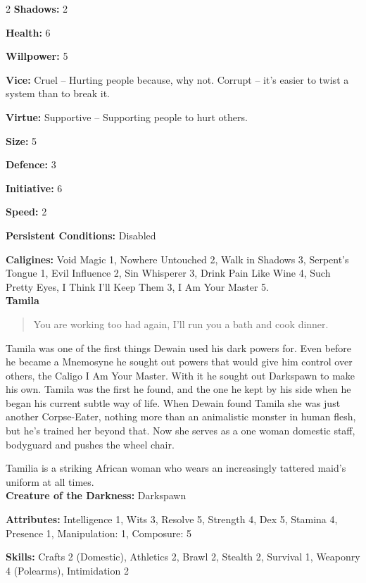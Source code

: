 \begin{multicols}{2}
\noindent \textbf{Shadows:} 2

\noindent \textbf{Health:} 6

\noindent \textbf{Willpower:} 5

\noindent \textbf{Vice:} Cruel – Hurting people because, why not. Corrupt – it's easier to twist a system than to break it. 

\noindent \textbf{Virtue:} Supportive – Supporting people to hurt others.

\noindent \textbf{Size:} 5

\noindent \textbf{Defence:} 3

\noindent \textbf{Initiative:} 6

\noindent \textbf{Speed:} 2

\noindent \textbf{Persistent Conditions:} Disabled

\noindent \textbf{Caligines:} Void Magic 1, Nowhere Untouched 2, Walk in Shadows 3, Serpent's Tongue 1, Evil Influence 2, Sin Whisperer 3, Drink Pain Like Wine 4, Such Pretty Eyes, I Think I'll Keep Them 3, I Am Your Master 5.\\

\noindent \textbf{Tamila}

\begin{quote}You are working too had again, I'll run you a bath and cook dinner.\end{quote}

Tamila was one of the first things Dewain used his dark powers for. Even before he became a Mnemosyne he sought out powers that would give him control over others, the Caligo I Am Your Master. With it he sought out Darkspawn to make his own. Tamila was the first he found, and the one he kept by his side when he began his current subtle way of life. When Dewain found Tamila she was just another Corpse-Eater, nothing more than an animalistic monster in human flesh, but he's trained her beyond that. Now she serves as a one woman domestic staff, bodyguard and pushes the wheel chair.

Tamilia is a striking African woman who wears an increasingly tattered maid's uniform at all times.\\

\noindent \textbf{Creature of the Darkness:} Darkspawn

\noindent \textbf{Attributes:} Intelligence 1, Wits 3, Resolve 5, Strength 4, Dex 5, Stamina 4, Presence 1, Manipulation: 1, Composure: 5

\noindent \textbf{Skills:} Crafts 2 (Domestic), Athletics 2, Brawl 2, Stealth 2, Survival 1, Weaponry 4 (Polearms), Intimidation 2


\end{multicols}
